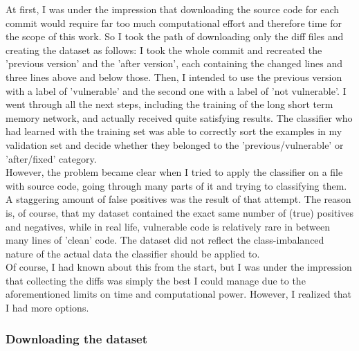 \documentclass[
a4paper,
pagesize,
pdftex,
12pt,
twoside, %
BCOR=5mm, %
ngerman,
fleqn,
final,
]{scrartcl}
\begin{document}
	At first, I was under the impression that downloading the source code for each commit would require far too much computational effort and therefore time for the scope of this work. So I took the path of downloading only the diff files and creating the dataset as follows: I took the whole commit and recreated the 'previous version' and the 'after version', each containing the changed lines and three lines above and below those. Then, I intended to use the previous version with a label of 'vulnerable' and the second one with a label of 'not vulnerable'. I went through all the next steps, including the training of the long short term memory network, and actually received quite satisfying results. The classifier who had learned with the training set was able to correctly sort the examples in my validation set and decide whether they belonged to the 'previous/vulnerable' or 'after/fixed' category.\\
	However, the problem became clear when I tried to apply the classifier on a file with source code, going through many parts of it and trying to classifying them. A staggering amount of false positives was the result of that attempt. The reason is, of course, that my dataset contained the exact same number of (true) positives and negatives, while in real life, vulnerable code is relatively rare in between many lines of 'clean' code. The dataset did not reflect the class-imbalanced nature of the actual data the classifier should be applied to.\\
	Of course, I had known about this from the start, but I was under the impression that collecting the diffs was simply the best I could manage due to the aforementioned limits on time and computational power. However, I realized that I had more options.
	
	
	\subsubsection{Downloading the dataset}
	
\end{document}
